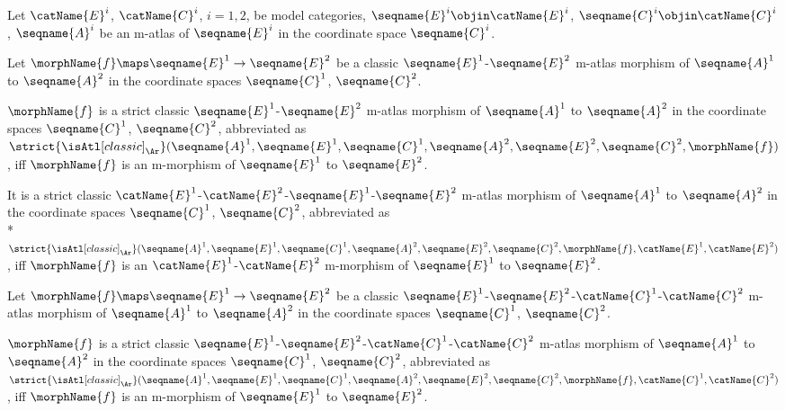 \documentclass{article}
\begin{document}
\begin{definition}
\label{def:M-ATLcmorphstrict}
Let $\catName{E}^i$, $\catName{C}^i$, $i=1,2$, be model categories,
$\seqname{E}^i \objin \catName{E}^i$,
$\seqname{C}^i \objin \catName{C}^i$, $\seqname{A}^i$ be an m-atlas of
$\seqname{E}^i$ in the coordinate space $\seqname{C}^i$.

Let $\morphName{f} \maps \seqname{E}^1 \to \seqname{E}^2$ be a classic
$\seqname{E}^1$-$\seqname{E}^2$ m-atlas morphism of
$\seqname{A}^1$ to $\seqname{A}^2$ in the coordinate spaces
$\seqname{C}^1$, $\seqname{C}^2$.

$\morphName{f}$ is a strict classic $\seqname{E}^1$-$\seqname{E}^2$
m-atlas morphism of $\seqname{A}^1$ to $\seqname{A}^2$ in the
coordinate spaces $\seqname{C}^1$, $\seqname{C}^2$, abbreviated as
$
  \strict{\isAtl[classic]_\Ar}
  (
    \seqname{A}^1,
    \seqname{E}^1,
    \seqname{C}^1,
    \seqname{A}^2,
    \seqname{E}^2,
    \seqname{C}^2,
    \morphName{f}
  )
$,
iff $\morphName{f}$ is an m-morphism of $\seqname{E}^1$ to $\seqname{E}^2$.

It is a strict classic
$\catName{E}^1$-$\catName{E}^2$-$\seqname{E}^1$-$\seqname{E}^2$ m-atlas
morphism of $\seqname{A}^1$ to $\seqname{A}^2$ in the coordinate
spaces $\seqname{C}^1$, $\seqname{C}^2$, abbreviated as \\*
$
  \strict{\isAtl[classic]_\Ar}
  (
    \seqname{A}^1,
    \seqname{E}^1,
    \seqname{C}^1,
    \seqname{A}^2,
    \seqname{E}^2,
    \seqname{C}^2,
    \morphName{f},
    \catName{E}^1,
    \catName{E}^2
  )
$,
iff $\morphName{f}$ is an $\catName{E}^1$-$\catName{E}^2$ m-morphism of
$\seqname{E}^1$ to $\seqname{E}^2$.

Let $\morphName{f} \maps \seqname{E}^1 \to \seqname{E}^2$ be a classic
$\seqname{E}^1$-$\seqname{E}^2$-$\catName{C}^1$-$\catName{C}^2$ m-atlas
morphism of $\seqname{A}^1$ to $\seqname{A}^2$ in the coordinate
spaces $\seqname{C}^1$, $\seqname{C}^2$.

$\morphName{f}$ is a strict classic
$\seqname{E}^1$-$\seqname{E}^2$-$\catName{C}^1$-$\catName{C}^2$
m-atlas morphism of $\seqname{A}^1$ to $\seqname{A}^2$ in the coordinate
spaces $\seqname{C}^1$, $\seqname{C}^2$, abbreviated as
$
  \strict{\isAtl[classic]_\Ar}
  (
    \seqname{A}^1,
    \seqname{E}^1,
    \seqname{C}^1,
    \seqname{A}^2,
    \seqname{E}^2,
    \seqname{C}^2,
    \morphName{f},
    \catName{C}^1,
    \catName{C}^2
  )
$,
iff $\morphName{f}$ is an m-morphism of $\seqname{E}^1$ to $\seqname{E}^2$.


\end{definition}
\end{document}
